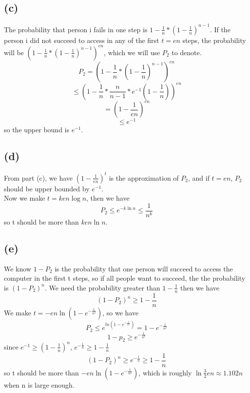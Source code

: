 \documentclass[twoside]{homework}
\begin{document}
\subsection*{(c)}
The probability that person i fails in one step is $1-\frac{1}{n}*(1-\frac{1}{n})^{n-1}$.
If the person i did not succeed to access in any of the first $t=en$ steps, the probability will be $(1-\frac{1}{n}*(1-\frac{1}{n})^{n-1})^{en}$, which we will use $P_2$ to denote.
$$P_2=(1-\frac{1}{n}*(1-\frac{1}{n})^{n-1})^{en}$$
$$\le (1-\frac{1}{n}*\frac{n}{n-1}*e^{-1}(1-\frac{1}{n}))^{en}$$
$$=(1-\frac{1}{en})^{en}$$
$$\le e^{-1}$$
so the upper bound is $e^{-1}$.
\subsection*{(d)}
From part (c), we have $(1-\frac{1}{en})^t$ is the approximation of $P_2$, and if $t=en$, $P_2$ should be upper bounded by $e^{-1}$.
\\Now we make $t=ken\log n$, then we have
$$P_2\le e^{-k\ln n}\le \frac{1}{n^k}$$
so t should be more than $ken\ln n$.
\subsection*{(e)}
We know $1-P_2$ is the probability that one person will succeed to access the computer in the first t steps, so if all people want to succeed, the the probability is $(1-P_2)^n$. We need the probability greater than $1-\frac{1}{n}$ then we have
$$(1-P_2)^n\ge 1-\frac{1}{n}$$
We make $t=-en\ln (1-e^{-\frac{1}{n^2}})$, so we have
$$P_2\le e^{ln (1-e^{-\frac{1}{n^2}})}=1-e^{-\frac{1}{n^2}}$$
$$1-p_2\ge e^{-\frac{1}{n^2}}$$
since $e^{-1}\ge (1-\frac{1}{n})^n$, $e^{-\frac{1}{n}}\ge 1-\frac{1}{n}$
$$(1-P_2)^n\ge e^{-\frac{1}{n}}\ge 1-\frac{1}{n}$$
so t should be more than $-en\ln (1-e^{-\frac{1}{n^2}})$, which is roughly $\ln \frac{3}{2}en \approx 1.102n $ when n is large enough.
\end{document}
